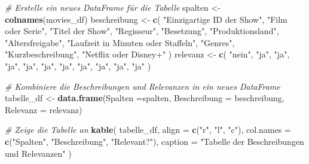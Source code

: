 \documentclass[
]{article}
\newenvironment{Shaded}{\begin{snugshade}}{\end{snugshade}}
\newcommand{\AttributeTok}[1]{\textcolor[rgb]{0.13,0.29,0.53}{#1}}
\newcommand{\CommentTok}[1]{\textcolor[rgb]{0.56,0.35,0.01}{\textit{#1}}}
\newcommand{\FunctionTok}[1]{\textcolor[rgb]{0.13,0.29,0.53}{\textbf{#1}}}
\newcommand{\NormalTok}[1]{#1}
\newcommand{\OtherTok}[1]{\textcolor[rgb]{0.56,0.35,0.01}{#1}}
\newcommand{\StringTok}[1]{\textcolor[rgb]{0.31,0.60,0.02}{#1}}
\begin{document}
\begin{Shaded}
\begin{Highlighting}[]
\CommentTok{\# Erstelle ein neues DataFrame für die Tabelle}
\NormalTok{spalten }\OtherTok{\textless{}{-}} \FunctionTok{colnames}\NormalTok{(movies\_df)}
\NormalTok{beschreibung }\OtherTok{\textless{}{-}} \FunctionTok{c}\NormalTok{(}
    \StringTok{"Einzigartige ID der Show"}\NormalTok{, }
    \StringTok{"Film oder Serie"}\NormalTok{, }
    \StringTok{"Titel der Show"}\NormalTok{, }
    \StringTok{"Regisseur"}\NormalTok{, }
    \StringTok{"Besetzung"}\NormalTok{,}
    \StringTok{"Produktionsland"}\NormalTok{,}
    \StringTok{"Altersfreigabe"}\NormalTok{,}
    \StringTok{"Laufzeit in Minuten oder Staffeln"}\NormalTok{,}
    \StringTok{"Genres"}\NormalTok{,}
    \StringTok{"Kurzbeschreibung"}\NormalTok{,}
    \StringTok{"Netflix oder Disney+"}
\NormalTok{)}
\NormalTok{relevanz }\OtherTok{\textless{}{-}} \FunctionTok{c}\NormalTok{(}
    \StringTok{"nein"}\NormalTok{,}
    \StringTok{"ja"}\NormalTok{,}
    \StringTok{"ja"}\NormalTok{,}
    \StringTok{"ja"}\NormalTok{,}
    \StringTok{"ja"}\NormalTok{,}
    \StringTok{"ja"}\NormalTok{,}
    \StringTok{"ja"}\NormalTok{,}
    \StringTok{"ja"}\NormalTok{,}
    \StringTok{"ja"}\NormalTok{,}
    \StringTok{"ja"}\NormalTok{,}
    \StringTok{"ja"}
\NormalTok{)}

\CommentTok{\# Kombiniere die Beschreibungen und Relevanzen in ein neues DataFrame}
\NormalTok{tabelle\_df }\OtherTok{\textless{}{-}} \FunctionTok{data.frame}\NormalTok{(}\AttributeTok{Spalten =}\NormalTok{spalten, }\AttributeTok{Beschreibung =}\NormalTok{ beschreibung, }\AttributeTok{Relevanz =}\NormalTok{ relevanz)}

\CommentTok{\# Zeige die Tabelle an}
\FunctionTok{kable}\NormalTok{(}
\NormalTok{  tabelle\_df,}
  \AttributeTok{align =} \FunctionTok{c}\NormalTok{(}\StringTok{"r"}\NormalTok{, }\StringTok{"l"}\NormalTok{, }\StringTok{"c"}\NormalTok{),}
  \AttributeTok{col.names =} \FunctionTok{c}\NormalTok{(}\StringTok{"Spalten"}\NormalTok{, }\StringTok{"Beschreibung"}\NormalTok{, }\StringTok{"Relevant?"}\NormalTok{),}
  \AttributeTok{caption =} \StringTok{"Tabelle der Beschreibungen und Relevanzen"}
\NormalTok{)}
\end{Highlighting}
\end{Shaded}
\end{document}
